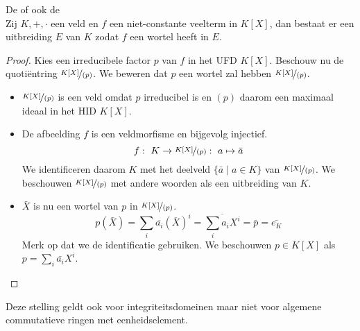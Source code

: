 \documentclass[main.tex]{subfiles}
\begin{document}
\begin{st}
  \label{st:fundamentele-stelling-van-veldentheorie}
  \examen
  De  of ook de \\
  Zij $K,+,\cdot$ een veld en $f$ een niet-constante veelterm in $K[X]$, dan bestaat er een uitbreiding $E$ van $K$ zodat $f$ een wortel heeft in $E$.

  \begin{proof}
    Kies een irreducibele factor $p$ van $f$ in het UFD $K[X]$.
    Beschouw nu de quoti\"entring $\nicefrac{K[X]}{(p)}$.
    We beweren dat $p$ een wortel zal hebben $\nicefrac{K[X]}{(p)}$.
    \begin{itemize}
    \item $\nicefrac{K[X]}{(p)}$ is een veld omdat $p$ irreducibel is en $(p)$ daarom een maximaal ideaal in het HID $K[X]$.
    \item De afbeelding $f$ is een veldmorfisme en bijgevolg injectief.
      \[ f:\ K \rightarrow \nicefrac{K[X]}{(p)}:\ a \mapsto \bar{a} \]
      We identificeren daarom $K$ met het deelveld $\{ \bar{a} \mid a\in K \}$ van $\nicefrac{K[X]}{(p)}$.
      We beschouwen $\nicefrac{K[X]}{(p)}$ met andere woorden als een uitbreiding van $K$.
    \item $\bar{X}$ is nu een wortel van $p$ in $\nicefrac{K[X]}{(p)}$.
      \[ p(\bar{X}) = \sum_{i}\overline{a_{i}}(\overline{X})^{i}= \overline{\sum_{i}a_{i}X^{i}} = \bar{p} = \bar{e_{K}} \]
      Merk op dat we de identificatie gebruiken.
      We beschouwen $p\in K[X]$ als $p = \sum_{i}\bar{a_{i}}X^{i}$.
    \end{itemize}
  \end{proof}
\end{st}

\begin{opm}
  Deze stelling geldt ook voor integriteitsdomeinen
  maar niet voor algemene commutatieve ringen met eenheidselement.
\end{opm}
\end{document}

